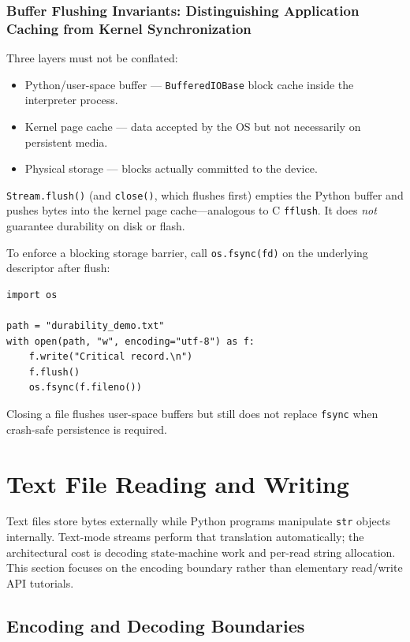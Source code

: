 \documentclass[a4paper,twoside]{report}
\begin{document}
\subsubsection{Buffer Flushing Invariants: Distinguishing Application Caching from Kernel Synchronization}

Three layers must not be conflated:

\begin{itemize}
    \item Python/user-space buffer --- \texttt{BufferedIOBase} block cache inside the interpreter process.
    \item Kernel page cache --- data accepted by the OS but not necessarily on persistent media.
    \item Physical storage --- blocks actually committed to the device.
\end{itemize}

\texttt{Stream.flush()} (and \texttt{close()}, which flushes first) empties the Python buffer and pushes bytes into the kernel page cache---analogous to C \texttt{fflush}. It does \emph{not} guarantee durability on disk or flash.

To enforce a blocking storage barrier, call \texttt{os.fsync(fd)} on the underlying descriptor after flush:

\begin{verbatim}
import os

path = "durability_demo.txt"
with open(path, "w", encoding="utf-8") as f:
    f.write("Critical record.\n")
    f.flush()
    os.fsync(f.fileno())
\end{verbatim}

Closing a file flushes user-space buffers but still does not replace \texttt{fsync} when crash-safe persistence is required.


\section{Text File Reading and Writing}

Text files store bytes externally while Python programs manipulate \texttt{str} objects internally. Text-mode streams perform that translation automatically; the architectural cost is decoding state-machine work and per-read string allocation. This section focuses on the encoding boundary rather than elementary read/write API tutorials.


\subsection{Encoding and Decoding Boundaries}
\end{document}
